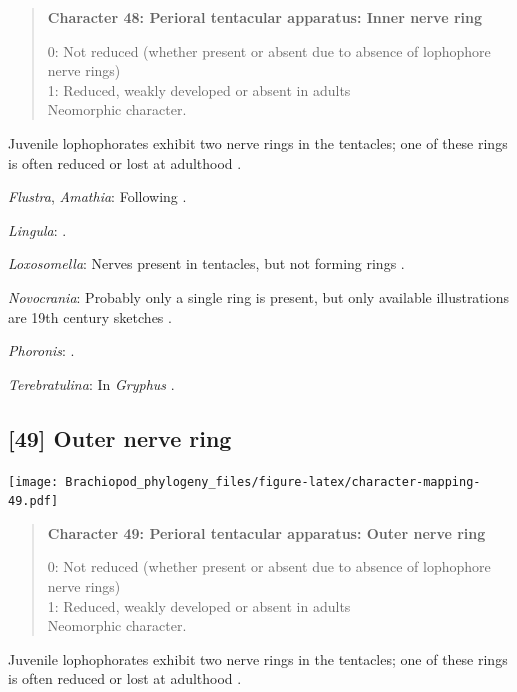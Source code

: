\documentclass[openany]{book}
\begin{document}
\begin{quote}
\textbf{Character 48: Perioral tentacular apparatus: Inner nerve ring}

0: Not reduced (whether present or absent due to absence of lophophore
nerve rings)\\
1: Reduced, weakly developed or absent in adults\\
Neomorphic character.
\end{quote}

Juvenile lophophorates exhibit two nerve rings in the tentacles; one of
these rings is often reduced or lost at adulthood
\citep{Temereva2017Innervationof}.

\hypertarget{Amathia-coding-48}{}
\emph{Flustra}, \emph{Amathia}: Following
\citet{Temereva2017Innervationof}.

\hypertarget{Lingula-coding-48}{}
\emph{Lingula}: \citet{Temereva2017Thefirst}.

\hypertarget{Loxosomella-coding-48}{}
\emph{Loxosomella}: Nerves present in tentacles, but not forming rings
\citep{Fuchs2006}.

\hypertarget{Novocrania-coding-48}{}
\emph{Novocrania}: Probably only a single ring is present, but only
available illustrations are 19th century sketches \citep{Luter2016}.

\hypertarget{Phoronis-coding-48}{}
\emph{Phoronis}: \citep{Temereva2017Innervationof}.

\hypertarget{Terebratulina-coding-48}{}
\emph{Terebratulina}: In \emph{Gryphus} \citep{Temereva2017Thefirst}.

\subsection*{{[}49{]} Outer nerve ring}\label{outer-nerve-ring}

\texttt{[image: Brachiopod\_phylogeny\_files/figure-latex/character-mapping-49.pdf]}

\begin{quote}
\textbf{Character 49: Perioral tentacular apparatus: Outer nerve ring}

0: Not reduced (whether present or absent due to absence of lophophore
nerve rings)\\
1: Reduced, weakly developed or absent in adults\\
Neomorphic character.
\end{quote}

Juvenile lophophorates exhibit two nerve rings in the tentacles; one of
these rings is often reduced or lost at adulthood
\citep{Temereva2017Innervationof}.
\end{document}
